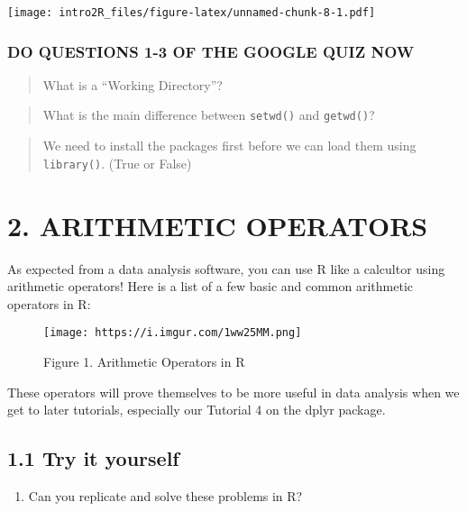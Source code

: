 \documentclass[
]{book}
\providecommand{\tightlist}{%
  \setlength{\itemsep}{0pt}\setlength{\parskip}{0pt}}
\begin{document}
\texttt{[image: intro2R\_files/figure-latex/unnamed-chunk-8-1.pdf]}

\hypertarget{do-questions-1-3-of-the-google-quiz-now}{%
\subsubsection{DO QUESTIONS 1-3 OF THE GOOGLE QUIZ NOW}\label{do-questions-1-3-of-the-google-quiz-now}}

\begin{quote}
What is a ``Working Directory''?
\end{quote}

\begin{quote}
What is the main difference between \texttt{setwd()} and \texttt{getwd()}?
\end{quote}

\begin{quote}
We need to install the packages first before we can load them using \texttt{library()}. (True or False)
\end{quote}

\hypertarget{arithmetic-operators}{%
\section{2. ARITHMETIC OPERATORS}\label{arithmetic-operators}}

As expected from a data analysis software, you can use R like a calcultor using arithmetic operators! Here is a list of a few basic and common arithmetic operators in R:

\begin{figure}
\centering
\texttt{[image: https://i.imgur.com/1ww25MM.png]}
\caption{Figure 1. Arithmetic Operators in R}
\end{figure}

These operators will prove themselves to be more useful in data analysis when we get to later tutorials, especially our Tutorial 4 on the dplyr package.

\hypertarget{try-it-yourself}{%
\subsection{1.1 Try it yourself}\label{try-it-yourself}}

\begin{enumerate}
\def\labelenumi{\alph{enumi}.}
\tightlist
\item
  Can you replicate and solve these problems in R?
\end{enumerate}
\end{document}
